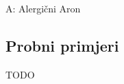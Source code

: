 \begin{statement}[
  timelimit=1 s,
  memorylimit=512 MiB,
]{A: Alergični Aron}
\subsection*{Probni primjeri}
  TODO

\end{statement}

